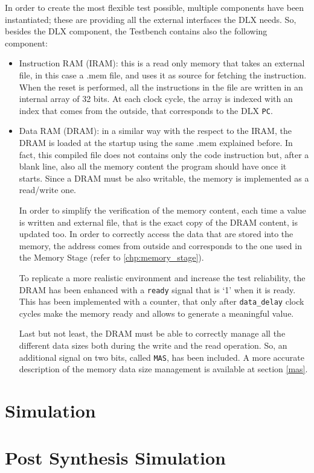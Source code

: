 In order to create the most flexible test possible, multiple components have been instantiated; these are providing all the external interfaces the DLX needs. So, besides the DLX component, the Testbench contains also the following component:
\begin{itemize} 
	\item Instruction RAM (IRAM): this is a read only memory that takes an external file, in this case a .mem file, and uses it as source for fetching the instruction. When the reset is performed, all the instructions in the file are written in an internal array of 32 bits. At each clock cycle, the array is indexed with an index that comes from the outside, that corresponds to the DLX \texttt{PC}.
	\item Data RAM (DRAM): in a similar way with the respect to the IRAM, the DRAM is loaded at the startup using the same .mem explained before. In fact, this compiled file does not contains only the code instruction but, after a blank line, also all the memory content the program should have once it starts. Since a DRAM must be also writable, the memory is implemented as a read/write one. 
	
	In order to simplify the verification of the memory content, each time a value is written and external file, that is the exact copy of the DRAM content, is updated too.
	In order to correctly access the data that are stored into the memory, the address comes from outside and corresponds to the one used in the Memory Stage (refer to \ref{chp:memory_stage}).
	
	To replicate a more realistic environment and increase the test reliability, the DRAM has been enhanced with a \texttt{ready} signal that is `1' when it is ready. This has been implemented with a counter, that only after \texttt{data\_delay} clock cycles make the memory ready and allows to generate a meaningful value.
	
	Last but not least, the DRAM must be able to correctly manage all the different data sizes both during the write and the read operation. So, an additional signal on two bits, called \texttt{MAS}, has been included. A more accurate description of the memory data size management is available at section \ref{mas}.
\end{itemize}

\section{Simulation}
\section{Post Synthesis Simulation}